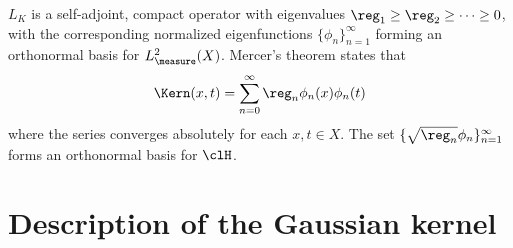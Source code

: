  $L_K$ is a self-adjoint, compact operator with eigenvalues $\reg_1 \geq \reg_2 \geq \cdots \geq 0$, with the corresponding normalized eigenfunctions $\{\phi_n\}_{n=1}^\infty$ forming an orthonormal basis for $L^2_\measure(X)$. Mercer's theorem states that 
\[
\Kern(x,t) = \sum_{n=0}^\infty \reg_n \phi_n(x) \phi_n(t)
\]
where the series converges absolutely for each $x,t \in X$. The set $\{\sqrt{\reg_n}\phi_n\}_{n=1}^\infty$ forms an orthonormal basis for $\clH$. 


\section{Description of the Gaussian kernel}
\label{s:gaussian_rkhs}

